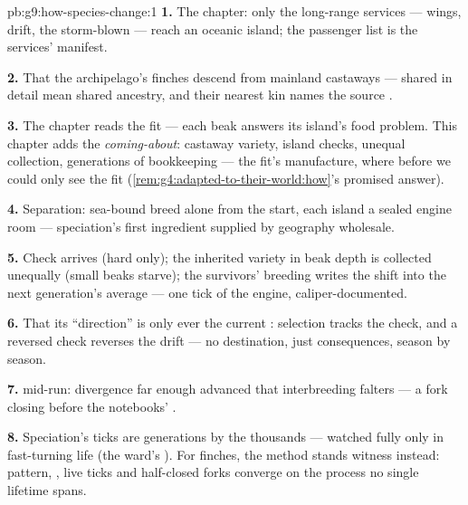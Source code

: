 \begin{solution}{pb:g9:how-species-change:1}
\textbf{1.} The  chapter: only the long-range
services --- wings, drift, the storm-blown --- reach an
oceanic island; the passenger list is the services'
manifest.

\textbf{2.} That the archipelago's finches descend from
mainland castaways --- shared  in detail mean
shared ancestry, and their nearest kin names the source
.

\textbf{3.} The  chapter reads the fit ---
each beak answers its island's food problem. This
chapter adds the \emph{coming-about}: castaway variety,
island checks, unequal collection, generations of
bookkeeping --- the fit's manufacture, where before we
could only see the fit
(\cref{rem:g4:adapted-to-their-world:how}'s promised
answer).

\textbf{4.} Separation: sea-bound  breed
alone from the start, each island a sealed engine room
--- speciation's first ingredient supplied by geography
wholesale.

\textbf{5.} Check arrives (hard  only); the
inherited variety in beak depth is collected unequally
(small beaks starve); the survivors' breeding writes
the shift into the next generation's average --- one
tick of the engine, caliper-documented.

\textbf{6.} That its ``direction'' is only ever the
current : selection tracks the check, and a
reversed check reverses the drift --- no destination,
just consequences, season by season.

\textbf{7.} 
mid-run: divergence far enough advanced that
interbreeding falters --- a fork closing before the
notebooks' .

\textbf{8.} Speciation's ticks are generations by the
thousands --- watched fully only in fast-turning life
(the ward's ). For finches, the method stands
witness instead: pattern, , live ticks and
half-closed forks converge on the process no single
lifetime spans.


\end{solution}
